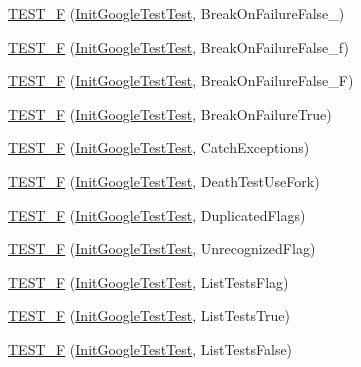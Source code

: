 \begin{DoxyCompactItemize}
\item 
\hyperlink{namespacetesting_abd2b3ac615374fbe560ba35be4c4e928}{T\+E\+S\+T\+\_\+F} (\hyperlink{classtesting_1_1_init_google_test_test}{Init\+Google\+Test\+Test}, Break\+On\+Failure\+False\+\_)
\item 
\hyperlink{namespacetesting_abb038e044a4f2142414624e482b48eeb}{T\+E\+S\+T\+\_\+F} (\hyperlink{classtesting_1_1_init_google_test_test}{Init\+Google\+Test\+Test}, Break\+On\+Failure\+False\+\_\+f)
\item 
\hyperlink{namespacetesting_aec19373865e49dbd1fe7f22c8db4a256}{T\+E\+S\+T\+\_\+F} (\hyperlink{classtesting_1_1_init_google_test_test}{Init\+Google\+Test\+Test}, Break\+On\+Failure\+False\+\_\+F)
\item 
\hyperlink{namespacetesting_aaf881d7ee8cfa238e9a66d0562937fde}{T\+E\+S\+T\+\_\+F} (\hyperlink{classtesting_1_1_init_google_test_test}{Init\+Google\+Test\+Test}, Break\+On\+Failure\+True)
\item 
\hyperlink{namespacetesting_af59442310531cd96d8aa3ce5acb2d025}{T\+E\+S\+T\+\_\+F} (\hyperlink{classtesting_1_1_init_google_test_test}{Init\+Google\+Test\+Test}, Catch\+Exceptions)
\item 
\hyperlink{namespacetesting_aa5259681257cd3654f34dc81212c82bc}{T\+E\+S\+T\+\_\+F} (\hyperlink{classtesting_1_1_init_google_test_test}{Init\+Google\+Test\+Test}, Death\+Test\+Use\+Fork)
\item 
\hyperlink{namespacetesting_a34b640eb46cf4189bed01f18d42d3277}{T\+E\+S\+T\+\_\+F} (\hyperlink{classtesting_1_1_init_google_test_test}{Init\+Google\+Test\+Test}, Duplicated\+Flags)
\item 
\hyperlink{namespacetesting_a1572c861f65ca8d5dfb61246a32a2799}{T\+E\+S\+T\+\_\+F} (\hyperlink{classtesting_1_1_init_google_test_test}{Init\+Google\+Test\+Test}, Unrecognized\+Flag)
\item 
\hyperlink{namespacetesting_a1d111e67e0c6411085ff6d0911f50d18}{T\+E\+S\+T\+\_\+F} (\hyperlink{classtesting_1_1_init_google_test_test}{Init\+Google\+Test\+Test}, List\+Tests\+Flag)
\item 
\hyperlink{namespacetesting_a000181c6b1ac347a3d7797324808ea8d}{T\+E\+S\+T\+\_\+F} (\hyperlink{classtesting_1_1_init_google_test_test}{Init\+Google\+Test\+Test}, List\+Tests\+True)
\item 
\hyperlink{namespacetesting_acc2334b947370b550b7d6241e0d34124}{T\+E\+S\+T\+\_\+F} (\hyperlink{classtesting_1_1_init_google_test_test}{Init\+Google\+Test\+Test}, List\+Tests\+False)
\item 

\end{DoxyCompactItemize}
